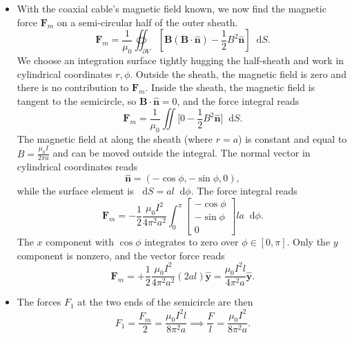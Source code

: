 \documentclass[11pt, a4paper]{article}
\newcommand{\diff}{\mathop{}\!\mathrm{d}} %
\renewcommand{\vec}[1]{\bm{#1}} %
\newcommand{\uvec}[1]{\hat{\vec{#1}}} %
\newcommand{\B}{\vec{B}}  %
\begin{document}
\begin{itemize}
	\item With the coaxial cable's magnetic field known, we now find the magnetic force $ \vec{F}_{m} $ on a semi-circular half of the outer sheath.
	\begin{equation*}
		\vec{F}_{m} = \frac{1}{\mu_{0}}\oiint_{\partial V}\left [\B(\B \cdot \uvec{n}) - \frac{1}{2}B^{2}\uvec{n}\right ] \diff S.
	\end{equation*}
	We choose an integration surface tightly hugging the half-sheath and work in cylindrical coordinates $ r, \phi $. Outside the sheath, the magnetic field is zero and there is no contribution to $ \bm{F}_{m} $. Inside the sheath, the magnetic field is tangent to the semicircle, so $ \vec{B}\cdot \uvec{n} = 0 $, and the force integral reads
	\begin{equation*}
		\vec{F}_{m} = \frac{1}{\mu_{0}} \iint \big[0 - \frac{1}{2}B^{2}\uvec{n}\big] \diff S .
	\end{equation*}
	The magnetic field at along the sheath (where $ r = a $) is constant and equal to $ B = \frac{\mu_{0}I}{2\pi a} $ and can be moved outside the integral. The normal vector in cylindrical coordinates reads 
	\begin{equation*}
		\uvec{n} = (- \cos \phi, -\sin \phi, 0),
	\end{equation*} 
	while the surface element is $ \diff S = a l \diff \phi $. The force integral reads
	\begin{equation*}
		\vec{F}_{m} = - \frac{1}{2}\frac{\mu_{0}I^{2}}{4\pi^{2}a^{2}} \int_{0}^{\pi}
		\begin{bmatrix}
			- \cos \phi\\
			 -\sin \phi\\
			  0
		\end{bmatrix}
		l a \diff \phi.
	\end{equation*}
	The $ x $ component with $ \cos \phi $ integrates to zero over $ \phi \in [0, \pi] $. Only the $ y $ component is nonzero, and the vector force reads
	\begin{equation*}
	 	\vec{F}_{m} = +\frac{1}{2}\frac{\mu_{0}I^{2}}{4\pi^{2}a^{2}} (2a l)\uvec{y} = \frac{\mu_{0}I^{2}l}{4\pi^{2}a} \uvec{y}.
	\end{equation*}
	
	\item The forces $ F_{1} $ at the two ends of the semicircle are then
	\begin{equation*}
		F_{1} = \frac{F_{m}}{2} =  \frac{\mu_{0}I^{2}l}{8\pi^{2}a} \implies \frac{F}{l} = \frac{\mu_{0}I^{2}}{8\pi^{2}a}.
	\end{equation*}
\end{itemize}
\end{document}
